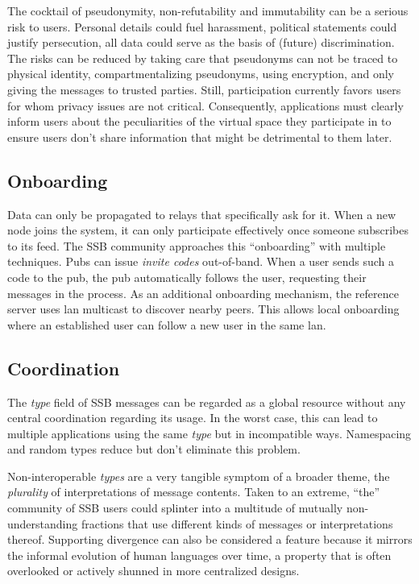 \documentclass[9pt,sigconf,rewiew]{acmart}
\begin{document}
The cocktail of pseudonymity, non-refutability and immutability can be a serious risk to users. Personal details could fuel harassment, political statements could justify persecution, all data could serve as the basis of (future) discrimination. The risks can be reduced by taking care that pseudonyms can not be traced to physical identity, compartmentalizing pseudonyms, using encryption, and only giving the messages to trusted parties. Still, participation currently favors users for whom privacy issues are not critical. Consequently, applications must clearly inform users about the peculiarities of the virtual space they participate in to ensure users don't share information that might be detrimental to them later.

\subsection{Onboarding}

Data can only be propagated to relays that specifically ask for it. When a new node joins the system, it can only participate effectively once someone subscribes to its feed. The SSB community approaches this ``onboarding'' with multiple techniques. Pubs can issue \textit{invite codes} out-of-band. When a user sends such a code to the pub, the pub automatically follows the user, requesting their messages in the process. As an additional onboarding mechanism, the reference server uses lan multicast to discover nearby peers. This allows local onboarding where an established user can follow a new user in the same lan.

\subsection{Coordination}

The \textit{type} field of SSB messages can be regarded as a global resource without any central coordination regarding its usage. In the worst case, this can lead to multiple applications using the same \textit{type} but in incompatible ways. Namespacing and random types reduce but don't eliminate this problem.

Non-interoperable \textit{types} are a very tangible symptom of a broader theme, the \textit{plurality} of interpretations of message contents. Taken to an extreme, ``the'' community of SSB users could splinter into a multitude of mutually non-understanding fractions that use different kinds of messages or interpretations thereof. Supporting divergence can also be considered a feature because it mirrors the informal evolution of human languages over time, a property that is often overlooked or actively shunned in more centralized designs.
\end{document}
